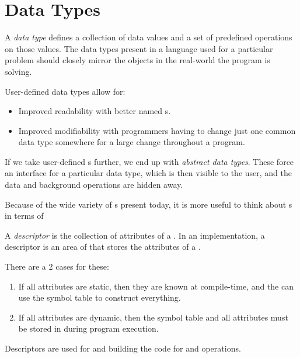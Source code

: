 \section{Data Types}\label{sec:Data_Types}
\begin{definition}\label{def:Data_Type}
  A \emph{data type} defines a collection of data values and a set of predefined operations on those values.
  The data types present in a language used for a particular problem should closely mirror the objects in the real-world the program is solving.
\end{definition}

User-defined data types allow for:
\begin{itemize}[noitemsep]
\item Improved readability with better named s.
\item Improved modifiability with programmers having to change just one common data type somewhere for a large change throughout a program.
\end{itemize}

If we take user-defined s further, we end up with \emph{abstract data types}.
These force an interface for a particular data type, which is then visible to the user, and the data and background operations are hidden away.

Because of the wide variety of s present today, it is more useful to think about s in terms of 

\begin{definition}[Descriptor]\label{def:Descriptor}
  A \emph{descriptor} is the collection of attributes of a .
  In an implementation, a descriptor is an area of  that stores the attributes of a .
  
  There are a 2 cases for these:
  \begin{enumerate}[noitemsep]
  \item If all attributes are static, then they are known at compile-time, and the  can use the symbol table to construct everything.
  \item If all attributes are dynamic, then the symbol table and all attributes must be stored in  during program execution.
  \end{enumerate}

  Descriptors are used for  and building the code for  and  operations.
\end{definition}

